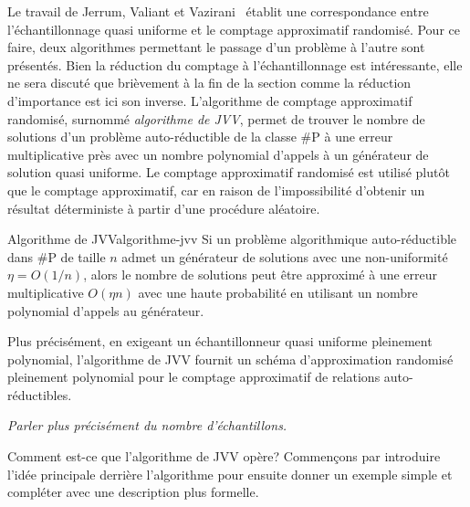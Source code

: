 Le travail de Jerrum, Valiant et Vazirani~\cite{jerrumRandomGenerationCombinatorial1986} établit une correspondance entre l'échantillonnage quasi uniforme et le comptage approximatif randomisé. Pour ce faire, deux algorithmes permettant le passage d'un problème à l'autre sont présentés. Bien la réduction du comptage à l'échantillonnage est intéressante, elle ne sera discuté que brièvement à la fin de la section comme la réduction d'importance est ici son inverse. L'algorithme de comptage approximatif randomisé, surnommé \textit{algorithme de JVV}, permet de trouver le nombre de solutions d'un problème auto-réductible de la classe \textsf{\#P} à une erreur multiplicative près avec un nombre polynomial d'appels à un générateur de solution quasi uniforme. Le comptage approximatif randomisé est utilisé plutôt que le comptage approximatif, car en raison de l'impossibilité d'obtenir un résultat déterministe à partir d'une procédure aléatoire.


\begin{maintheorem}{Algorithme de JVV}{algorithme-jvv}
    Si un problème algorithmique auto-réductible dans \textsf{\#P} de taille $n$ admet un générateur de solutions avec une non-uniformité $\eta = O(1 / n)$, alors le nombre de solutions peut être approximé à une erreur multiplicative $O(\eta n)$ avec une haute probabilité en utilisant un nombre polynomial d'appels au générateur.
\end{maintheorem}

Plus précisément, en exigeant un échantillonneur quasi uniforme pleinement polynomial, l'algorithme de JVV fournit un schéma d'approximation randomisé pleinement polynomial pour le comptage approximatif de relations auto-réductibles.

\textcolor{mydarkred}{\textit{Parler plus précisément du nombre d'échantillons.}}

Comment est-ce que l'algorithme de JVV opère? Commençons par introduire l'idée principale derrière l'algorithme pour ensuite donner un exemple simple et compléter avec une description plus formelle. 

